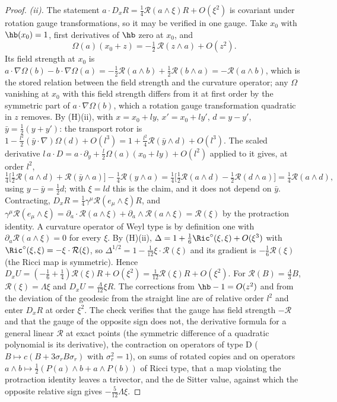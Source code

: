 \begin{proof}
\emph{(ii).} The statement $a\cdot D_{x}R = \tfrac14\mathcal{R}(a\wedge\xi)R + O(\xi^{2})$ is covariant under rotation gauge transformations, so it may be verified in one gauge. Take $x_{0}$ with $\hb(x_{0}) = 1$, first derivatives of $\hb$ zero at $x_{0}$, and
\[
\Omega(a)(x_{0} + z) = -\tfrac12\,\mathcal{R}(z\wedge a) + O(z^{2}) .
\]
Its field strength at $x_{0}$ is $a\cdot\nabla\Omega(b) - b\cdot\nabla\Omega(a) = -\tfrac12\mathcal{R}(a\wedge b) + \tfrac12\mathcal{R}(b\wedge a) = -\mathcal{R}(a\wedge b)$, which is the stored relation between the field strength and the curvature operator; any $\Omega$ vanishing at $x_{0}$ with this field strength differs from it at first order by the symmetric part of $a\cdot\nabla\Omega(b)$, which a rotation gauge transformation quadratic in $z$ removes. By (H)(ii), with $x = x_{0} + ly$, $x' = x_{0} + ly'$, $d = y - y'$, $\bar y = \tfrac12(y + y')$: the transport rotor is $1 - \tfrac{l^{2}}{2}(\bar y\cdot\nabla)\Omega(d) + O(l^{3}) = 1 + \tfrac{l^{2}}{4}\mathcal{R}(\bar y\wedge d) + O(l^{3})$. The scaled derivative $l\,a\cdot D = a\cdot\partial_{y} + \tfrac{l}{2}\Omega(a)(x_{0} + ly) + O(l^{2})$ applied to it gives, at order $l^{2}$,
\[
\tfrac14\bigl[\tfrac12\mathcal{R}(a\wedge d) + \mathcal{R}(\bar y\wedge a)\bigr] - \tfrac14\mathcal{R}(y\wedge a) = \tfrac14\bigl[\tfrac12\mathcal{R}(a\wedge d) - \tfrac12\mathcal{R}(d\wedge a)\bigr] = \tfrac14\mathcal{R}(a\wedge d),
\]
using $y - \bar y = \tfrac12 d$; with $\xi = ld$ this is the claim, and it does not depend on $\bar y$. Contracting, $D_{x}R = \tfrac14\gamma^{\mu}\mathcal{R}(e_{\mu}\wedge\xi)R$, and $\gamma^{\mu}\mathcal{R}(e_{\mu}\wedge\xi) = \partial_{a}\cdot\mathcal{R}(a\wedge\xi) + \partial_{a}\wedge\mathcal{R}(a\wedge\xi) = \mathcal{R}(\xi)$ by the protraction identity. A curvature operator of Weyl type is by definition one with $\partial_{a}\mathcal{R}(a\wedge\xi) = 0$ for every $\xi$. By (H)(ii), $\Delta = 1 + \tfrac16\Ric^{\circ}(\xi, \xi) + O(\xi^{3})$ with $\Ric^{\circ}(\xi, \xi) = -\xi\cdot\mathcal{R}(\xi)$, so $\Delta^{1/2} = 1 - \tfrac1{12}\xi\cdot\mathcal{R}(\xi)$ and its gradient is $-\tfrac16\mathcal{R}(\xi)$ (the Ricci map is symmetric). Hence $D_{x}U = (-\tfrac16 + \tfrac14)\mathcal{R}(\xi)R + O(\xi^{2}) = \tfrac1{12}\mathcal{R}(\xi)R + O(\xi^{2})$. For $\mathcal{R}(B) = \tfrac{\Lambda}{3}B$, $\mathcal{R}(\xi) = \Lambda\xi$ and $D_{x}U = \tfrac{\Lambda}{12}\xi R$. The corrections from $\hb - 1 = O(z^{2})$ and from the deviation of the geodesic from the straight line are of relative order $l^{2}$ and enter $D_{x}R$ at order $\xi^{2}$. The check verifies that the gauge has field strength $-\mathcal{R}$ and that the gauge of the opposite sign does not, the derivative formula for a general linear $\mathcal{R}$ at exact points (the symmetric difference of a quadratic polynomial is its derivative), the contraction on operators of type D ($B \mapsto c(B + 3\sigma_{r}B\sigma_{r})$ with $\sigma_{r}^{2} = 1$), on sums of rotated copies and on operators $a\wedge b \mapsto \tfrac12(P(a)\wedge b + a\wedge P(b))$ of Ricci type, that a map violating the protraction identity leaves a trivector, and the de Sitter value, against which the opposite relative sign gives $-\tfrac{5}{12}\Lambda\xi$.


\end{proof}

